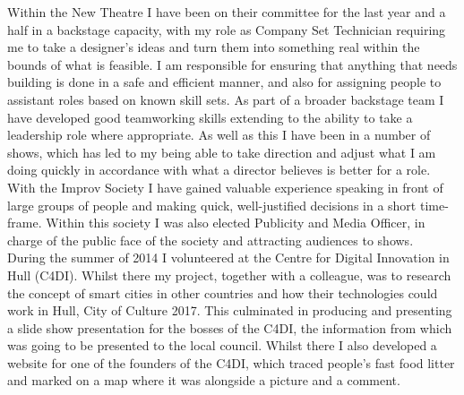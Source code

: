 \documentclass[10pt]{article}
\begin{document}
Within the New Theatre I have been on their committee for the last year and a half in a backstage capacity, with my role as Company Set Technician requiring me to take a designer's ideas and turn them into something real within the bounds of what is feasible.
I am responsible for ensuring that anything that needs building is done in a safe and efficient manner, and also for assigning people to assistant roles based on known skill sets.
As part of a broader backstage team I have developed good teamworking skills extending to the ability to take a leadership role where appropriate.
As well as this I have been in a number of shows, which has led to my being able to take direction and adjust what I am doing quickly in accordance with what a director believes is better for a role.\\

With the Improv Society I have gained valuable experience speaking in front of large groups of people and making quick, well-justified decisions in a short time-frame.
Within this society I was also elected Publicity and Media Officer, in charge of the public face of the society and attracting audiences to shows.\\

During the summer of 2014 I volunteered at the Centre for Digital Innovation in Hull (C4DI).
Whilst there my project, together with a colleague, was to research the concept of smart cities in other countries and how their technologies could work in Hull, City of Culture 2017.
This culminated in producing and presenting a slide show presentation for the bosses of the C4DI, the information from which was going to be presented to the local council.
Whilst there I also developed a website for one of the founders of the C4DI, which traced people's fast food litter and marked on a map where it was alongside a picture and a comment.
\end{document}
